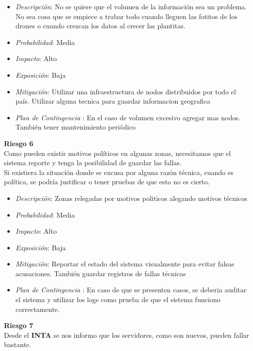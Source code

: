 \begin{itemize}
 \item \textsl{Descripci\'on}: No se quiere que el volumen de la informaci\'on sea un problema. No sea cosa que se empiece a trabar todo cuando lleguen las fotitos de los drones o cuando crezcan los datos al crecer las plantitas.
 \item \textsl{Probabilidad}: Media
 \item \textsl{Impacto}: Alto	
 \item \textsl{Exposición}: Baja
 \item \textsl{Mitigación}: Utilizar una infraestructura de nodos distribuidos por todo el país. Utilizar alguna tecnica para guardar informacion geografica
 \item \textsl{Plan de Contingencia} : En el caso de volumen excesivo agregar mas nodos. Tambi\'en tener mantenimiento peri\'odico
\end{itemize}

\textbf{Riesgo 6}\\
Como pueden existir motivos pol\'iticos en algunas zonas, necesitamos que el sistema reporte y tenga la posibilidad de guardar las fallas. \\
Si existiera la situaci\'on donde se excusa por alguna raz\'on t\'ecnica, cuando es pol\'itica, se podr\'ia justificar o tener pruebas de que esto no es cierto.

\begin{itemize}
 \item \textsl{Descripci\'on}: Zonas relegadas por motivos politicos alegando motivos t\'ecnicos
 \item \textsl{Probabilidad}: Media
 \item \textsl{Impacto}: Alto
 \item \textsl{Exposición}: Baja
 \item \textsl{Mitigación}: Reportar el estado del sistema visualmente para evitar falsas acusaciones. Tambi\'en guardar registros de fallas t\'ecnicas
 \item \textsl{Plan de Contingencia} : En caso de que se presenten casos, se deberia auditar el sistema y utilizar los logs como prueba de que el sistema funciono correctamente. 
\end{itemize}

\textbf{Riesgo 7}\\
Desde el \textbf{INTA} se nos informo que los servidores, como son nuevos, pueden fallar bastante.\\

